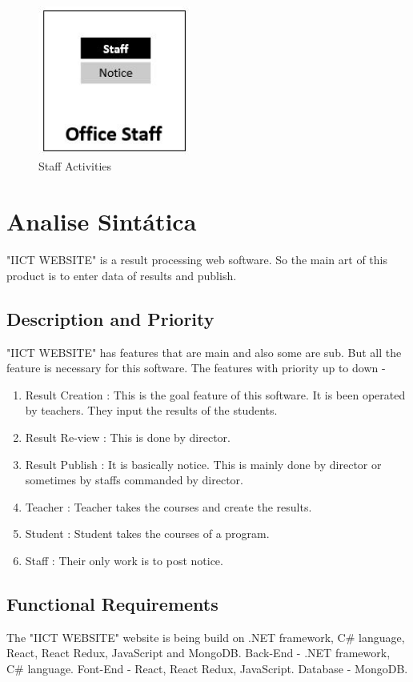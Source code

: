 \documentclass{scrreprt}
\begin{document}
\begin{figure}[h!]
    \centering
    \includegraphics[width=5cm]{6.JPG}
    \caption{Staff Activities}
    \label{fig:Staff Activities}
\end{figure}

\chapter{Analise Sintática}
"IICT WEBSITE" is a result processing web software. So the main art of this product is to enter data of results and publish. 

\section{Description and Priority}
"IICT WEBSITE" has features that are main and also some are sub. But all the feature is necessary for this software.
\newline
The features with priority up to down - 
\begin{enumerate}
    \item Result Creation : This is the goal feature of this software. It is been operated by teachers. They input the results of the students.
    \item Result Re-view : This is done by director.
    \item Result Publish : It is basically notice. This is mainly done by director or sometimes by staffs commanded by director.
    \item Teacher : Teacher takes the courses and create the results.
    \item Student : Student takes the courses of a program.
    \item Staff : Their only work is to post notice.
\end{enumerate}

\section{Functional Requirements}
The "IICT WEBSITE" website is being build on .NET framework, C\# language, React, React Redux, JavaScript and MongoDB.
\newline
Back-End - .NET framework, C\# language.
\newline
Font-End - React, React Redux, JavaScript.
\newline
Database -  MongoDB.
\end{document}
